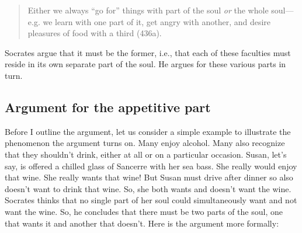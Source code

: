 \documentclass[oneside]{article}
\begin{document}
\begin{quote}
Either we always ``go for'' things with part of the soul \emph{or} the whole soul---e.g. we learn with one part of it, get angry with another, and desire pleasures of food with a third (436a). 
\end{quote}
Socrates argue that it must be the former, i.e., that each of these faculties must reside in its own separate part of the soul. He argues for these various parts in turn. 

\subsection*{Argument for the appetitive part}
Before I outline the argument, let us consider a simple example to illustrate the phenomenon the argument turns on. Many enjoy alcohol. Many also recognize that they shouldn't drink, either at all or on a particular occasion. Susan, let's say, is offered a chilled glass of Sancerre with her sea bass. She really would enjoy that wine. She really wants that wine! But Susan must drive after dinner so also doesn't want to drink that wine. So, she both wants and doesn't want the wine. Socrates thinks that no single part of her soul could simultaneously want and not want the wine. So, he concludes that there must be two parts of the soul, one that wants it and another that doesn't. Here is the argument more formally:
\end{document}
